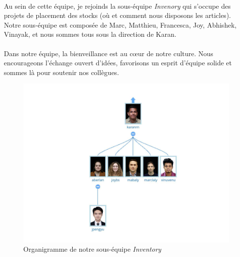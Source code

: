 \paragraph{}
\vspace{-2em}  %
Au sein de cette équipe, je rejoinds la sous-équipe \textit{Invenory} qui s'occupe des projets de placement des stocks (où et comment nous disposons les articles). Notre sous-équipe est composée de Marc, Matthieu, Francesca, Joy, Abhishek, Vinayak, et nous sommes tous sous la direction de Karan. 
\paragraph{}
\vspace{-2em}  %
Dans notre équipe, la bienveillance est au cœur de notre culture. Nous encourageons l'échange ouvert d'idées, favorisons un esprit d'équipe solide et sommes là pour soutenir nos collègues.

\begin{figure}[htbp]
    \centering
    \includegraphics[width=0.8\linewidth]{./Graphismes-UTC/logos/Amazon/equipe.pdf}\hfill
    \caption{Organigramme de notre sous-équipe \textit{Inventory}} 
\end{figure}



